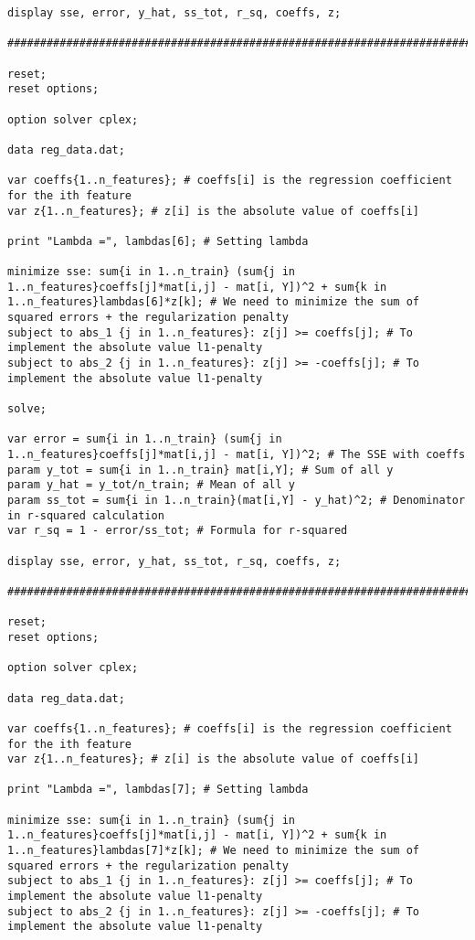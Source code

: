 \documentclass[15pt,a4paper,openright]{article}
\begin{document}
\begin{lstlisting}[language=AMPL, caption=1c Code]
display sse, error, y_hat, ss_tot, r_sq, coeffs, z;

#############################################################################

reset;
reset options;

option solver cplex;

data reg_data.dat;

var coeffs{1..n_features}; # coeffs[i] is the regression coefficient for the ith feature
var z{1..n_features}; # z[i] is the absolute value of coeffs[i]

print "Lambda =", lambdas[6]; # Setting lambda

minimize sse: sum{i in 1..n_train} (sum{j in 1..n_features}coeffs[j]*mat[i,j] - mat[i, Y])^2 + sum{k in 1..n_features}lambdas[6]*z[k]; # We need to minimize the sum of squared errors + the regularization penalty
subject to abs_1 {j in 1..n_features}: z[j] >= coeffs[j]; # To implement the absolute value l1-penalty
subject to abs_2 {j in 1..n_features}: z[j] >= -coeffs[j]; # To implement the absolute value l1-penalty

solve;

var error = sum{i in 1..n_train} (sum{j in 1..n_features}coeffs[j]*mat[i,j] - mat[i, Y])^2; # The SSE with coeffs
param y_tot = sum{i in 1..n_train} mat[i,Y]; # Sum of all y
param y_hat = y_tot/n_train; # Mean of all y
param ss_tot = sum{i in 1..n_train}(mat[i,Y] - y_hat)^2; # Denominator in r-squared calculation
var r_sq = 1 - error/ss_tot; # Formula for r-squared

display sse, error, y_hat, ss_tot, r_sq, coeffs, z;

#############################################################################

reset;
reset options;

option solver cplex;

data reg_data.dat;

var coeffs{1..n_features}; # coeffs[i] is the regression coefficient for the ith feature
var z{1..n_features}; # z[i] is the absolute value of coeffs[i]

print "Lambda =", lambdas[7]; # Setting lambda

minimize sse: sum{i in 1..n_train} (sum{j in 1..n_features}coeffs[j]*mat[i,j] - mat[i, Y])^2 + sum{k in 1..n_features}lambdas[7]*z[k]; # We need to minimize the sum of squared errors + the regularization penalty
subject to abs_1 {j in 1..n_features}: z[j] >= coeffs[j]; # To implement the absolute value l1-penalty
subject to abs_2 {j in 1..n_features}: z[j] >= -coeffs[j]; # To implement the absolute value l1-penalty


\end{lstlisting}
\end{document}

